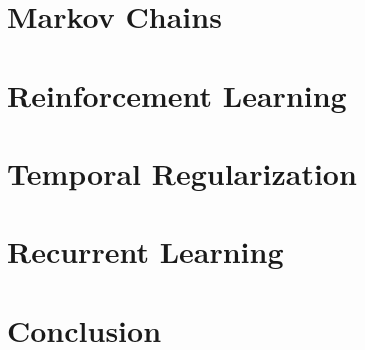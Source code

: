 \documentclass[12pt, oneside, extrafontsizes]{memoir}
\begin{document}
\chapter{Markov Chains}
\label{chap:markov}


\chapter{Reinforcement Learning}
\label{chap:reinforcement}



\chapter{Temporal Regularization}
\label{chap:temporal}



\chapter{Recurrent Learning}
\label{chap:recurrent}




\chapter{Conclusion}


%
%
\printbibliography
\end{document}
